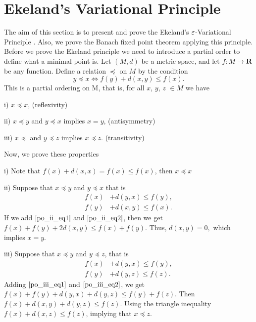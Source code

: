 \section{Ekeland's Variational Principle}
    The aim of this section is to present and prove the Ekeland's 
    $\varepsilon$-Variational Principle \citep{Ekeland_OTVP}. Also, we prove the Banach 
    fixed point theorem applying this principle. Before we prove the Ekeland
    principle we need to introduce a partial order to define what a 
    minimal point is. Let $(M,d)$ be a metric space, and let 
    $f : M \to \mathbf{R}$ be any function. Define a relation $\preceq$ on $M$ by
    the condition 
    $$
        y \preceq x \iff f(y) + d(x,y) \leq f(x).
    $$
    This is a partial ordering on M, that is, for all $x$, $y$, $z$ $\in M$ we have
    \begin{asparaenum}
        \item[i)] $x \preceq x$, (reflexivity)
        \item[ii)] $x \preceq y$ and $y \preceq x$ implies $x = y$, (antisymmetry)
        \item[iii)] $x \preceq$ and $y \preceq z$ implies $x \preceq z$. %
            (transitivity)
    \end{asparaenum}
    Now, we prove these properties
    \begin{asparaenum}
        \item[i)]
            Note that $f(x) + d(x,x) = f(x) \leq f(x)$, then $x \preceq x$
        \item[ii)]
            Suppose that $x \preceq y$ and $y \preceq x$ that is
            \begin{align}
                f(x) &+ d(y, x) \leq f(y), \label{po_ii_eq1}\\
                f(y) &+ d(x, y) \leq f(x). \label{po_ii_eq2}
            \end{align}
            If we add $\cref{po_ii_eq1}$ and $\cref{po_ii_eq2}$, then we get
            $
                f(x) + f(y) + 2 d(x,y) \leq f(x) + f(y).
            $
            Thus,
            $
                d(x, y) = 0,
            $
            which implies $x = y$.
        \item[iii)]
            Suppose that $ x \preceq y$ and $y \preceq z$, that is
            \begin{align}
                f(x) &+ d(y, x) \leq f(y), \label{po_iii_eq1}\\
                f(y) &+ d(y, z) \leq f(z). \label{po_iii_eq2}  
            \end{align}
            Adding $\cref{po_iii_eq1}$ and $\cref{po_iii_eq2}$, we get
            $
                f(x) + f(y) + d(y,x) + d(y, z) \leq f(y) + f(z).
            $
            Then $f(x) + d(x,y) + d(y, z) \leq f(z)$. 
            Using the triangle inequality $f(x) + d(x, z) \leq f(z)$, implying
            that $x \preceq z$.
    \end{asparaenum}
